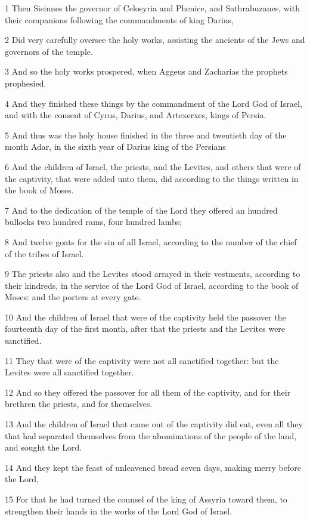 \par 1 Then Sisinnes the governor of Celosyria and Phenice, and Sathrabuzanes, with their companions following the commandments of king Darius,
\par 2 Did very carefully oversee the holy works, assisting the ancients of the Jews and governors of the temple.
\par 3 And so the holy works prospered, when Aggeus and Zacharias the prophets prophesied.
\par 4 And they finished these things by the commandment of the Lord God of Israel, and with the consent of Cyrus, Darius, and Artexerxes, kings of Persia.
\par 5 And thus was the holy house finished in the three and twentieth day of the month Adar, in the sixth year of Darius king of the Persians
\par 6 And the children of Israel, the priests, and the Levites, and others that were of the captivity, that were added unto them, did according to the things written in the book of Moses.
\par 7 And to the dedication of the temple of the Lord they offered an hundred bullocks two hundred rams, four hundred lambs;
\par 8 And twelve goats for the sin of all Israel, according to the number of the chief of the tribes of Israel.
\par 9 The priests also and the Levites stood arrayed in their vestments, according to their kindreds, in the service of the Lord God of Israel, according to the book of Moses: and the porters at every gate.
\par 10 And the children of Israel that were of the captivity held the passover the fourteenth day of the first month, after that the priests and the Levites were sanctified.
\par 11 They that were of the captivity were not all sanctified together: but the Levites were all sanctified together.
\par 12 And so they offered the passover for all them of the captivity, and for their brethren the priests, and for themselves.
\par 13 And the children of Israel that came out of the captivity did eat, even all they that had separated themselves from the abominations of the people of the land, and sought the Lord.
\par 14 And they kept the feast of unleavened bread seven days, making merry before the Lord,
\par 15 For that he had turned the counsel of the king of Assyria toward them, to strengthen their hands in the works of the Lord God of Israel.

